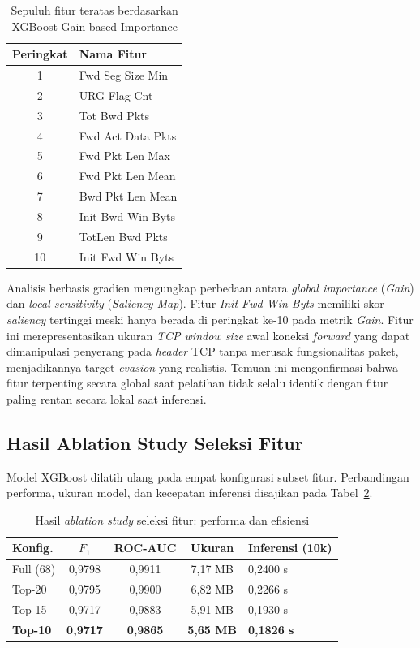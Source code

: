 \documentclass[10pt,twocolumn,a4paper]{extarticle}
\begin{document}
\begin{table}[htbp]
\caption{Sepuluh fitur teratas berdasarkan XGBoost Gain-based Importance}
\label{tab:feature_importance}
\centering
\footnotesize
\begin{tabular}{@{} c l @{}}
\toprule
\textbf{Peringkat} & \textbf{Nama Fitur} \\ \midrule
1 & Fwd Seg Size Min \\
2 & URG Flag Cnt \\
3 & Tot Bwd Pkts \\
4 & Fwd Act Data Pkts \\
5 & Fwd Pkt Len Max \\
6 & Fwd Pkt Len Mean \\
7 & Bwd Pkt Len Mean \\
8 & Init Bwd Win Byts \\
9 & TotLen Bwd Pkts \\
10 & Init Fwd Win Byts \\ \bottomrule
\end{tabular}
\end{table}

Analisis berbasis gradien mengungkap perbedaan antara \textit{global importance} (\textit{Gain}) dan \textit{local sensitivity} (\textit{Saliency Map}). Fitur \textit{Init Fwd Win Byts} memiliki skor \textit{saliency} tertinggi meski hanya berada di peringkat ke-10 pada metrik \textit{Gain}. Fitur ini merepresentasikan ukuran \textit{TCP window size} awal koneksi \textit{forward} yang dapat dimanipulasi penyerang pada \textit{header} TCP tanpa merusak fungsionalitas paket, menjadikannya target \textit{evasion} yang realistis. Temuan ini mengonfirmasi bahwa fitur terpenting secara global saat pelatihan tidak selalu identik dengan fitur paling rentan secara lokal saat inferensi.

\subsection{Hasil Ablation Study Seleksi Fitur}
\label{sec:hasil_ablation}
Model XGBoost dilatih ulang pada empat konfigurasi subset fitur. Perbandingan performa, ukuran model, dan kecepatan inferensi disajikan pada Tabel~\ref{tab:ablation_feature_selection}.

\begin{table}[htbp]
\caption{Hasil \textit{ablation study} seleksi fitur: performa dan efisiensi}
\label{tab:ablation_feature_selection}
\centering
\footnotesize
\begin{tabularx}{\linewidth}{@{} l c c c X @{}}
\toprule
\textbf{Konfig.} & \textbf{$F_1$} & \textbf{ROC-AUC} & \textbf{Ukuran} & \textbf{Inferensi (10k)} \\ \midrule
Full (68) & 0,9798 & 0,9911 & 7,17 MB & 0,2400 s \\
Top-20 & 0,9795 & 0,9900 & 6,82 MB & 0,2266 s \\
Top-15 & 0,9717 & 0,9883 & 5,91 MB & 0,1930 s \\
\textbf{Top-10} & \textbf{0,9717} & \textbf{0,9865} & \textbf{5,65 MB} & \textbf{0,1826 s} \\ \bottomrule
\end{tabularx}
\end{table}
\end{document}
